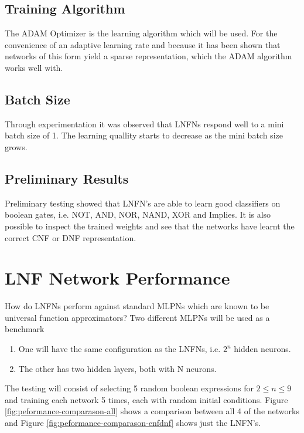 \subsection{Training Algorithm}


The ADAM Optimizer \cite{kingma2014adam} is the learning algorithm which will be used. For the convenience of an adaptive learning rate and because it has been shown that networks of this form yield a sparse representation, which the ADAM algorithm works well with.

\subsection{Batch Size}
Through experimentation it was observed that LNFNs respond well to a mini batch size of 1. The learning quallity starts to decrease as the mini batch size grows.

\subsection{Preliminary Results}
Preliminary testing showed that LNFN's are able to learn good classifiers on boolean gates, i.e. NOT, AND, NOR, NAND, XOR and Implies. It is also possible to inspect the trained weights and see that the networks have learnt the correct CNF or DNF representation.

\section{LNF Network Performance}
How do LNFNs perform against standard MLPNs which are known to be universal function approximators? Two different MLPNs will be used as a benchmark

\begin{enumerate}
	\item One will have the same configuration as the LNFNs, i.e. $2^n$ hidden neurons. \label{lnfn-peformance:mlpn-arch-1}
	\item The other has two hidden layers, both with N neurons.
\end{enumerate}

The testing will consist of selecting 5 random boolean expressions for $2 \leq n \leq 9$ and training each network 5 times, each with random initial conditions. Figure \ref{fig:peformance-comparason-all} shows a comparison between all 4 of the networks and Figure \ref{fig:peformance-comparason-cnfdnf} shows just the LNFN's.

